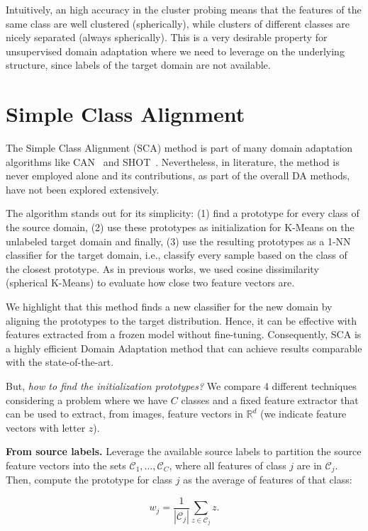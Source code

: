 \documentclass{article}
\begin{document}
Intuitively, an high accuracy in the cluster probing means that the features of the same class are well clustered (spherically), while clusters of different classes are nicely separated (always spherically). This is a very desirable property for unsupervised domain adaptation where we need to leverage on the underlying structure, since labels of the target domain are not available.


\section{Simple Class Alignment}
\label{scaappendix}
The Simple Class Alignment (SCA) method is part of many domain adaptation algorithms like CAN~\citep{kang2019contrastive} and SHOT~\citep{liang2020we}.
Nevertheless, in literature, the method is never employed alone and its contributions, as part of the overall DA methods, have not been explored extensively.

The algorithm stands out for its simplicity: (1) find a prototype for every class of the source domain, (2) use these prototypes as initialization for K-Means on the unlabeled target domain and finally, (3) use the resulting prototypes as a 1-NN classifier for the target domain, i.e., classify every sample based on the class of the closest prototype. As in previous works, we used cosine dissimilarity (spherical K-Means) to evaluate how close two feature vectors are.

We highlight that this method finds a new classifier for the new domain by aligning the prototypes to the target distribution. Hence, it can be effective with features extracted from a frozen model without fine-tuning. Consequently, SCA is a highly efficient Domain Adaptation method that can achieve results comparable with the state-of-the-art.

But, \textit{how to find the initialization prototypes?} We compare 4 different techniques considering a problem where we have $C$ classes and a fixed feature extractor that can be used to extract, from images, feature vectors in $\mathbb{R}^d$ (we indicate feature vectors with letter $z$).

\textbf{From source labels.} Leverage the available source labels to partition the source feature vectors into the sets $\mathcal{C}_1, \ldots, \mathcal{C}_C$, where all features of class $j$ are in $\mathcal{C}_j$. Then, compute the prototype for class $j$ as the average of features of that class:

\begin{equation}
    w_j = \frac{1}{|\mathcal{C}_j|}\sum_{z \in \mathcal{C}_j} z.
\end{equation}
\end{document}
